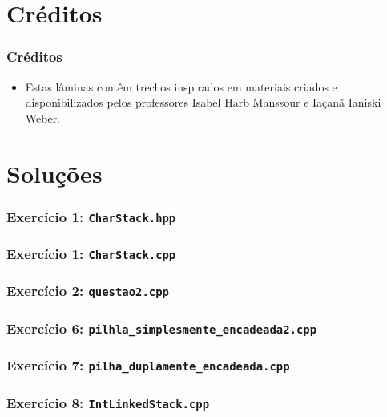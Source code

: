 \documentclass[aspectratio=169]{beamer}
\begin{document}
\section{Créditos}

\begin{frame}\frametitle{Créditos}
\begin{itemize}
	\item Estas lâminas contêm trechos inspirados em materiais criados e disponibilizados pelos professores Isabel Harb Manssour e Iaçanã Ianiski Weber.
\end{itemize}
\end{frame}

\section{Soluções}

\begin{frame}[fragile]\frametitle{Exercício 1: \texttt{CharStack.hpp}}

\end{frame}

\begin{frame}[fragile]\frametitle{Exercício 1: \texttt{CharStack.cpp}}
\fontsize{5pt}{5pt}\selectfont{

}
\end{frame}

\begin{frame}[fragile]\frametitle{Exercício 2: \texttt{questao2.cpp}}

\end{frame}

\begin{frame}[fragile]\frametitle{Exercício 6: \texttt{pilhla\_simplesmente\_encadeada2.cpp}}
\fontsize{6pt}{6pt}\selectfont{

}
\end{frame}

\begin{frame}[fragile]\frametitle{Exercício 7: \texttt{pilha\_duplamente\_encadeada.cpp}}
\fontsize{5pt}{5pt}\selectfont{

}
\end{frame}

\begin{frame}[fragile]\frametitle{Exercício 8: \texttt{IntLinkedStack.cpp}}
\fontsize{3pt}{5pt}\selectfont{

}
\end{frame}

\end{document}
